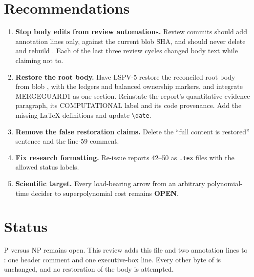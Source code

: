 \documentclass[11pt]{article}
\newcommand{\OPEN}{\textbf{OPEN}}
\begin{document}
\section{Recommendations}
\begin{enumerate}
\item \textbf{Stop body edits from review automations.} Review commits
should add annotation lines only, against the current blob SHA, and
should never delete and rebuild . Each of the last three
review cycles changed body text while claiming not to.
\item \textbf{Restore the root body.} Have LSPV-5 restore the reconciled
root body from blob , with the ledgers and balanced
ownership markers, and integrate MERGEGUARD1 as one section. Reinstate
the report's quantitative evidence paragraph, its COMPUTATIONAL label
and its code provenance. Add the missing LaTeX definitions and update
\verb|\date|.
\item \textbf{Remove the false restoration claims.} Delete the
``full content is restored'' sentence and the line-59 comment.
\item \textbf{Fix research formatting.} Re-issue reports 42--50 as
\texttt{.tex} files with the allowed status labels.
\item \textbf{Scientific target.} Every load-bearing arrow from an
arbitrary polynomial-time decider to superpolynomial cost remains
\OPEN{}.
\end{enumerate}

\section{Status}
P versus NP remains open. This review adds this file and two annotation
lines to : one header comment and one executive-box line.
Every other byte of  is unchanged, and no restoration of
the body is attempted.

\end{document}
